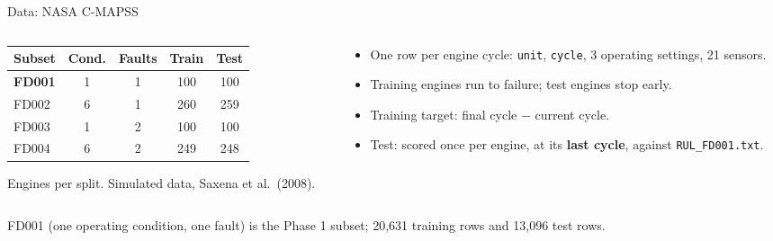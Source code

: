 \documentclass[aspectratio=169,11pt]{beamer}
\newcommand{\takeaway}[1]{\par\vspace{0.6em}{\color{accent}\textbf{Takeaway:}} #1}
\begin{document}
\begin{frame}{Data: NASA C-MAPSS}
  \begin{columns}[T]
    \begin{column}{0.52\textwidth}
      \small
      \begin{tabular}{lcccc}
        \toprule
        Subset & Cond. & Faults & Train & Test \\
        \midrule
        \textbf{FD001} & 1 & 1 & 100 & 100 \\
        FD002 & 6 & 1 & 260 & 259 \\
        FD003 & 1 & 2 & 100 & 100 \\
        FD004 & 6 & 2 & 249 & 248 \\
        \bottomrule
      \end{tabular}
      \vspace{0.6em}

      {\footnotesize Engines per split. Simulated data, Saxena et al.\ (2008).}
    \end{column}
    \begin{column}{0.46\textwidth}
      \small
      \begin{itemize}
        \item One row per engine cycle: \texttt{unit}, \texttt{cycle},
          3 operating settings, 21 sensors.
        \item Training engines run to failure; test engines stop early.
        \item Training target: final cycle $-$ current cycle.
        \item Test: scored once per engine, at its \textbf{last cycle},
          against \texttt{RUL\_FD001.txt}.
      \end{itemize}
    \end{column}
  \end{columns}
  \takeaway{FD001 (one operating condition, one fault) is the Phase 1 subset;
  20,631 training rows and 13,096 test rows.}
\end{frame}
\end{document}
